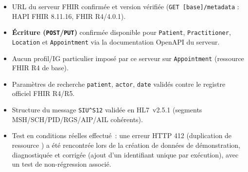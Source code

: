 \documentclass[11pt,a4paper]{article}
\newcommand{\siu}{SIU\textasciicircum{}S12}
\begin{document}
\begin{itemize}[leftmargin=1.2cm]
  \item[\checkmark] URL du serveur FHIR confirm\'ee et version v\'erifi\'ee (\texttt{GET~[base]/metadata} : HAPI FHIR 8.11.16, FHIR R4/4.0.1).
  \item[\checkmark] \textbf{\'Ecriture (\texttt{POST}/\texttt{PUT})} confirm\'ee disponible pour \texttt{Patient}, \texttt{Practitioner}, \texttt{Location} et \texttt{Appointment} via la documentation OpenAPI du serveur.
  \item[\checkmark] Aucun profil/IG particulier impos\'e par ce serveur sur \texttt{Appointment} (ressource FHIR R4 de base).
  \item[\checkmark] Param\`etres de recherche \texttt{patient}, \texttt{actor}, \texttt{date} valid\'es contre le registre officiel FHIR R4/R5.
  \item[\checkmark] Structure du message \texttt{\siu} valid\'ee en HL7~v2.5.1 (segments MSH/SCH/PID/RGS/AIP/AIL coh\'erents).
  \item[\checkmark] Test en conditions r\'eelles effectu\'e~: une erreur HTTP 412 (\og duplication de ressource \fg) a \'et\'e rencontr\'ee lors de la cr\'eation de donn\'ees de d\'emonstration, diagnostiqu\'ee et corrig\'ee (ajout d'un identifiant unique par ex\'ecution), avec un test de non-r\'egression associ\'e.
\end{itemize}
\end{document}
